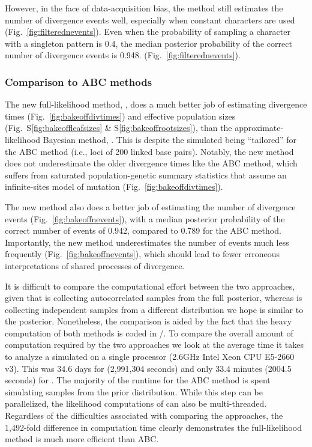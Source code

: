 \ifembed{

}{}

However, in the face of data-acquisition bias, the method still estimates the
number of divergence events well, especially when constant characters are used
(Fig.~\ref{fig:filterednevents}).
Even when the probability of sampling a character with a singleton pattern is
0.4, the median posterior probability of the correct number of divergence
events is 0.948.
(Fig.~\ref{fig:filterednevents}).

\ifembed{

}{}

\subsubsection{Comparison to ABC methods}

The new full-likelihood method, \ecoevolity, does a much better job of
estimating divergence times
(Fig.~\ref{fig:bakeoffdivtimes})
and effective population sizes
(Fig.\ 
S\ref{fig:bakeoffleafsizes}
\&
S\ref{fig:bakeoffrootsizes}),
than the approximate-likelihood Bayesian method, \dppmsbayes.
This is despite the simulated \datasets being ``tailored'' for the ABC method
(i.e., loci of 200 linked base pairs).
Notably, the new method does not underestimate the older divergence times like
the ABC method, which suffers from saturated population-genetic summary
statistics that assume an infinite-sites model of mutation
(Fig.~\ref{fig:bakeoffdivtimes}).

\ifembed{

}{}

The new method also does a better job of estimating the number of divergence
events (Fig.~\ref{fig:bakeoffnevents}), with a median posterior probability
of the correct number of events of 0.942, compared to 0.789 for the ABC method.
Importantly, the new method underestimates the number of events much less
frequently (Fig.~\ref{fig:bakeoffnevents}),
which should lead to fewer erroneous interpretations of shared processes of
divergence.

\ifembed{

}{}

It is difficult to compare the computational effort between the two approaches,
given that \ecoevolity is collecting autocorrelated samples from
the full posterior, whereas \dppmsbayes is collecting independent samples
from a different distribution we hope is similar to the posterior.
Nonetheless, the comparison is aided by the fact that the heavy computation of
both methods is coded in \clang/\cpp.
To compare the overall amount of computation required by the two approaches
we look at the average time it takes to analyze a simulated \dataset
on a single processor 
(2.6GHz Intel Xeon CPU E5-2660 v3).
This was 34.6 days for \dppmsbayes (2,991,304 seconds)
and only 33.4 minutes (2004.5 seconds) for \ecoevolity.
The majority of the runtime for the ABC method is spent simulating samples
from the prior distribution.
While this step can be parallelized, the likelihood computations of \ecoevolity
can also be multi-threaded.
Regardless of the difficulties associated with comparing the approaches, the
1,492-fold difference in computation time clearly demonstrates the
full-likelihood method is much more efficient than ABC.


